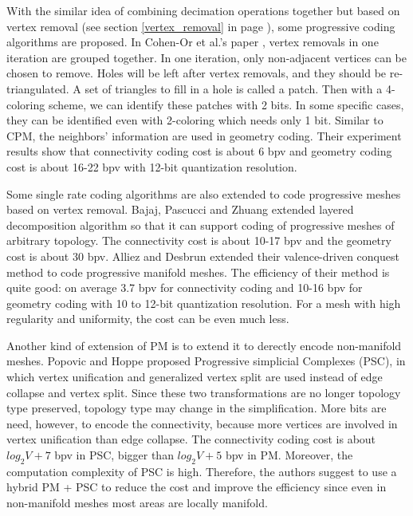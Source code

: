 \documentclass[11pt, a4paper]{report}
\begin{document}
    With the similar idea of combining decimation operations together
    but based on vertex removal (see section \ref{vertex_removal} in
    page \pageref{vertex_removal}), some progressive coding algorithms
    are proposed. In Cohen-Or et al.'s paper \cite{319358},
    vertex removals in one iteration are grouped together. In one
    iteration, only non-adjacent vertices can be chosen to remove.
    Holes will be left after vertex removals, and they should be
    re-triangulated. A set of triangles to fill in a hole is called a
    patch. Then with a 4-coloring scheme, we can identify these
    patches with 2 bits. In some specific cases, they can be
    identified even with 2-coloring which needs only 1 bit. Similar
    to CPM, the neighbors' information are used in geometry coding.
    Their experiment results show that connectivity coding cost is
    about 6 bpv and geometry coding cost is about 16-22 bpv with
    12-bit quantization resolution.

    Some single rate coding algorithms are also extended to code
    progressive meshes based on vertex removal. Bajaj, Pascucci and
    Zhuang \cite{319426} extended layered decomposition algorithm
    \cite{789628} so that it can support coding of progressive meshes
    of arbitrary topology. The connectivity cost is about 10-17 bpv
    and the geometry cost is about 30 bpv. Alliez and Desbrun
    \cite{383281} extended their valence-driven conquest
    method \cite{alliez01valencedriven}to code progressive manifold
    meshes. The efficiency of their method is quite good: on average
    3.7 bpv for connectivity coding and 10-16 bpv for geometry coding
    with 10 to 12-bit quantization resolution. For a mesh with high
    regularity and uniformity, the cost can be even much less.

    Another kind of extension of PM is to extend it to derectly encode non-manifold meshes. 
    Popovic and Hoppe \cite{258852} proposed Progressive simplicial Complexes (PSC), in
    which vertex unification and generalized vertex split are used instead of edge
    collapse and vertex split. Since these two transformations are no
    longer topology type preserved, topology type may change in the
    simplification. More bits are need, however, to encode the
    connectivity, because more vertices are involved in vertex
    unification than edge collapse. The connectivity coding cost is about $log_{2}V
    + 7$ bpv in PSC, bigger than $log_{2}V + 5$ bpv in PM. Moreover,
    the computation complexity of PSC is high. Therefore, the
    authors suggest to use a hybrid PM + PSC to reduce the cost and
    improve the efficiency since even in non-manifold meshes most areas
    are locally manifold.
\end{document}

